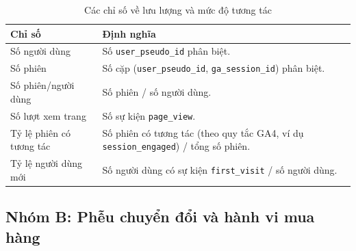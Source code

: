 \begin{table}[H]
    \centering
    \renewcommand{\arraystretch}{1.2}
    \caption{Các chỉ số về lưu lượng và mức độ tương tác}
    \label{tab:traffic_kpi}
    \begin{tabularx}{\textwidth}
    {
        >{\raggedright\arraybackslash}p{4.2cm}
        >{\raggedright\arraybackslash}X
    }
        \hline
        \textbf{Chỉ số} & \textbf{Định nghĩa} \\
        \hline
        Số người dùng &
        Số \texttt{user\_pseudo\_id} phân biệt. \\

        Số phiên &
        Số cặp (\texttt{user\_pseudo\_id}, \texttt{ga\_session\_id}) phân biệt. \\

        Số phiên/người dùng &
        Số phiên / số người dùng. \\

        Số lượt xem trang &
        Số sự kiện \texttt{page\_view}. \\

        Tỷ lệ phiên có tương tác &
        Số phiên có tương tác (theo quy tắc GA4, ví dụ \texttt{session\_engaged}) / tổng số phiên. \\

        Tỷ lệ người dùng mới &
        Số người dùng có sự kiện \texttt{first\_visit} / số người dùng. \\
        \hline
    \end{tabularx}
\end{table}

\subsection*{Nhóm B: Phễu chuyển đổi và hành vi mua hàng}

